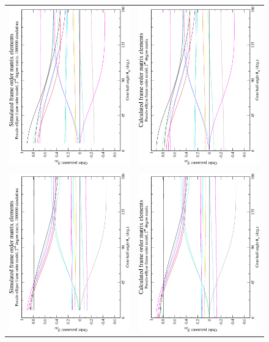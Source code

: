 \begin{figure}
\centering
  \begin{tabular}{@{}cc@{}}
    \includegraphics[width=.35\textwidth,angle=270]{images/frame_order_matrix/Sijkl_pseudo-ellipse_in_frame_theta_x_ens1000000.eps} &
    \includegraphics[width=.35\textwidth,angle=270]{images/frame_order_matrix/Sijkl_pseudo-ellipse_in_frame_theta_x_calc.eps} \\
    \\[-5pt]
    \includegraphics[width=.35\textwidth,angle=270]{images/frame_order_matrix/Sijkl_pseudo-ellipse_in_frame_theta_y_ens1000000.eps} &
    \includegraphics[width=.35\textwidth,angle=270]{images/frame_order_matrix/Sijkl_pseudo-ellipse_in_frame_theta_y_calc.eps} \\

\end{tabular}
\end{figure}
